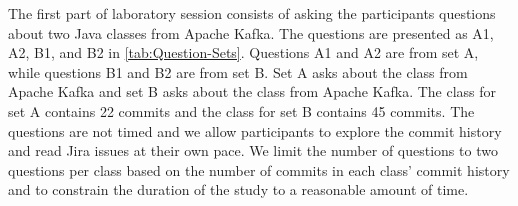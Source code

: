The first part of  laboratory session consists of 
asking the participants questions about two Java classes from Apache Kafka.
The questions are presented as A1, A2, B1, and B2 in \autoref{tab:Question-Sets}.
Questions A1 and A2 are from set A, while questions B1 and B2 are from set B.
Set A asks about the  class from Apache Kafka and 
set B asks about the  class from Apache Kafka.
The  class for set A contains 22 commits and the  class for set B contains 45 commits.
The questions are not timed and we allow participants to explore the commit history and read Jira issues at their own pace.
We limit the number of questions to two questions per class based on the number of commits in each class' commit history and 
to constrain the duration of the study to a reasonable amount of time.

